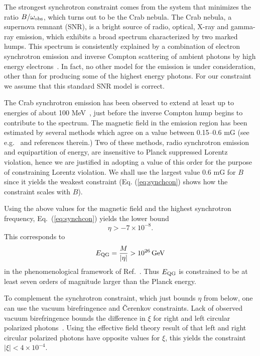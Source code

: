 \documentclass[12pt]{article}
\begin{document}
The strongest synchrotron constraint comes from the
system that minimizes the ratio $B/\omega_{\rm obs}$, which
turns out to be the Crab nebula. The Crab nebula, a
supernova remnant (SNR), is a bright source of radio,
optical, X-ray and gamma-ray emission, which exhibits a
broad spectrum characterized by two marked humps. This
spectrum is consistently explained by a combination of
electron synchrotron emission and inverse Compton
scattering of ambient photons by high energy
electrons~\cite{AA96, deJager}. In fact, no other model
for the emission is under consideration, other than for
producing some of the highest energy photons. For our
constraint we assume that this standard SNR model is
correct.

The Crab synchrotron emission has been observed to extend
at least up to energies of about 100 MeV~\cite{AA96,
  deJager}, just before the inverse Compton hump begins
to contribute to the spectrum. The magnetic field in the
emission region has been estimated by several methods
which agree on a value between 0.15--0.6 mG (see
e.g.~\cite{Hillas} and references therein.) Two of these
methods, radio synchrotron emission and equipartition of
energy, are insensitive to Planck suppressed Lorentz
violation, hence we are justified in adopting a value of
this order for the purpose of constraining Lorentz
violation. We shall use the largest value 0.6 mG for $B$
since it yields the weakest constraint (Eq.
(\ref{eq:synchcon}) shows how the constraint scales with
$B$).

Using the above values for the magnetic field and the highest
synchrotron  frequency, Eq.~(\ref{eq:synchcon}) yields the lower
bound
%
\begin{equation}
\eta > - 7\times 10^{-8}.\label{eq:numba2}
\end{equation}
%
This corresponds to
%
\begin{equation}
E_{\rm QG}=\frac{M}{|\eta|} > 10^{26}\, {\rm GeV}
\label{eq:numbaQG}
\end{equation}
%
in the phenomenological framework of
Ref.~\cite{Amelino-Camelia:1997gz}. Thus $E_{\rm QG} $ is
constrained to be at least seven orders of magnitude
larger than the Planck energy.

To complement the synchrotron constraint, which just
bounds $\eta$ from below, one can use the vacuum
birefringence and \v{C}erenkov constraints. Lack of
observed vacuum birefringence bounds the difference in
$\xi$ for right and left circular polarized
photons~\cite{GK}. Using the effective field theory
result of \cite{MP} that left and right circular
polarized photons have opposite values for $\xi$, this
yields the constraint $|\xi|< 4\times10^{-4}$.
\end{document}
